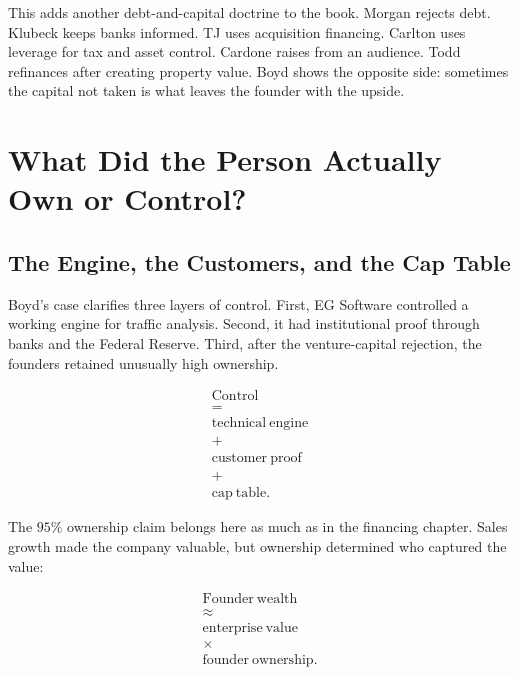 \documentclass[11pt,oneside]{book}
\begin{document}
This adds another debt-and-capital doctrine to the book. Morgan rejects debt. Klubeck keeps banks informed. TJ uses acquisition financing. Carlton uses leverage for tax and asset control. Cardone raises from an audience. Todd refinances after creating property value. Boyd shows the opposite side: sometimes the capital not taken is what leaves the founder with the upside.

\chapter{What Did the Person Actually Own or Control?}

\section{The Engine, the Customers, and the Cap Table}

Boyd's case clarifies three layers of control. First, EG Software controlled a working engine for traffic analysis. Second, it had institutional proof through banks and the Federal Reserve. Third, after the venture-capital rejection, the founders retained unusually high ownership.

\begin{equation}
\begin{gathered}
\mathrm{Control}\\
=\\
\mathrm{technical\ engine}\\
+\\
\mathrm{customer\ proof}\\
+\\
\mathrm{cap\ table}.
\end{gathered}
\end{equation}

The \(95\%\) ownership claim belongs here as much as in the financing chapter. Sales growth made the company valuable, but ownership determined who captured the value:

\begin{equation}
\begin{gathered}
\mathrm{Founder\ wealth}\\
\approx\\
\mathrm{enterprise\ value}\\
\times\\
\mathrm{founder\ ownership}.
\end{gathered}
\end{equation}
\end{document}

